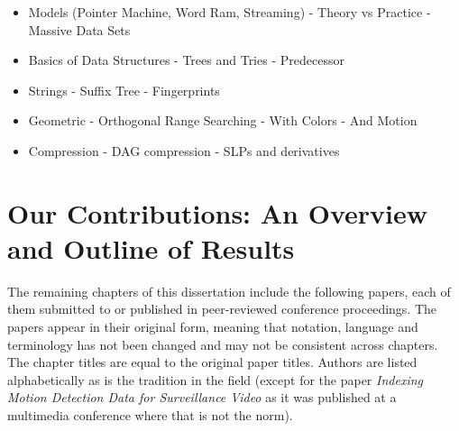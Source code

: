 \begin{itemize}
    \item Models (Pointer Machine, Word Ram, Streaming)
        - Theory vs Practice
        - Massive Data Sets
    \item Basics of Data Structures
        - Trees and Tries
        - Predecessor
    \item Strings
        - Suffix Tree
        - Fingerprints
    \item Geometric
        - Orthogonal Range Searching
        - With Colors
        - And Motion
    \item Compression
        - DAG compression
        - SLPs and derivatives
\end{itemize}



\section{Our Contributions: An Overview and Outline of Results}
The remaining chapters of this dissertation include the following papers, each of them submitted to or published in peer-reviewed conference proceedings. The papers appear in their original form, meaning that notation, language and terminology has not been changed and may not be consistent across chapters. The chapter titles are equal to the original paper titles. Authors are listed alphabetically as is the tradition in the field (except for the paper \emph{Indexing Motion Detection Data for Surveillance Video} as it was published at a multimedia conference where that is not the norm).

